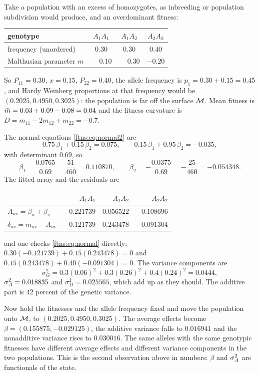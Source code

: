 \begin{example}
\label{ftns:ex:ls}
Take a population with an excess of homozygotes, as inbreeding or population subdivision would
produce, and an overdominant fitness:
\begin{center}
\begin{tabular}{lccc}
\toprule
genotype & $A_1A_1$ & $A_1A_2$ & $A_2A_2$ \\
\midrule
frequency (unordered) & $0.30$ & $0.30$ & $0.40$ \\
Malthusian parameter $m$ & $\phantom{-}0.10$ & $\phantom{-}0.30$ & $-0.20$ \\
\bottomrule
\end{tabular}
\end{center}
So $P_{11}=0.30$, $x=0.15$, $P_{22}=0.40$, the allele frequency is $p_1=0.30+0.15=0.45$, and Hardy
Weinberg proportions at that frequency would be $(0.2025,0.4950,0.3025)$: the population is far
off the surface $\mathcal{M}$. Mean fitness is $\bar{m}=0.03+0.09-0.08=0.04$ and the fitness curvature is
$D=m_{11}-2m_{12}+m_{22}=-0.7$.

The normal equations \eqref{ftns:eq:normal2} are
\[
0.75\,\beta_1+0.15\,\beta_2=0.075,\qquad 0.15\,\beta_1+0.95\,\beta_2=-0.035,
\]
with determinant $0.69$, so
\[
\beta_1=\frac{0.0765}{0.69}=\frac{51}{460}=0.110870,\qquad
\beta_2=-\frac{0.0375}{0.69}=-\frac{25}{460}=-0.054348 .
\]
The fitted array and the residuals are
\begin{center}
\begin{tabular}{lrrr}
\toprule
 & $A_1A_1$ & $A_1A_2$ & $A_2A_2$ \\
\midrule
$A_{uv}=\beta_u+\beta_v$ & $0.221739$ & $0.056522$ & $-0.108696$ \\
$\delta_{uv}=m_{uv}-A_{uv}$ & $-0.121739$ & $0.243478$ & $-0.091304$ \\
\bottomrule
\end{tabular}
\end{center}
and one checks \eqref{ftns:eq:normal} directly: $0.30(-0.121739)+0.15(0.243478)=0$ and
$0.15(0.243478)+0.40(-0.091304)=0$. The variance components are
\[
\sigma^2_G=0.3(0.06)^2+0.3(0.26)^2+0.4(0.24)^2=0.0444,
\]
$\sigma^{2}_{A}=0.018835$ and $\sigma^2_D=0.025565$,
which add up as they should. The additive part is $42$ percent of the genetic variance.

Now hold the fitnesses and the allele frequency fixed and move the population onto $\mathcal{M}$, to
$(0.2025,0.4950,0.3025)$. The average effects become $\beta=(0.155875,-0.029125)$, the additive
variance falls to $0.016941$ and the nonadditive variance rises to $0.030016$. The same alleles
with the same genotypic fitnesses have different average effects and different variance components
in the two populations. This is the second observation above in numbers: $\beta$ and $\sigma^{2}_{A}$ are
functionals of the state.
\end{example}

